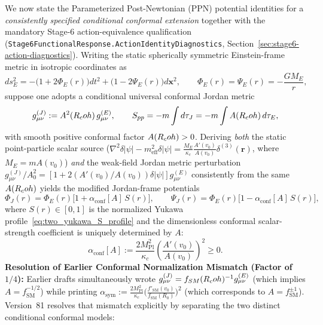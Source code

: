 We now state the Parameterized Post-Newtonian (PPN) potential identities for a \emph{consistently specified conditional conformal extension} together with the mandatory Stage-6 action-equivalence qualification (\texttt{Stage6FunctionalResponse.\allowbreak{}ActionIdentityDiagnostics}, Section~\ref{sec:stage6-action-diagnostics}). Writing the static spherically symmetric Einstein-frame metric in isotropic coordinates as
\[
ds_E^2 = -\bigl(1 + 2\Phi_E(r)\bigr)dt^2 + \bigl(1 - 2\Psi_E(r)\bigr)d\mathbf{x}^2,
\qquad
\Phi_E(r) = \Psi_E(r) = -\frac{G M_E}{r},
\]
suppose one adopts a conditional universal conformal Jordan metric
\begin{equation}
g_{\mu\nu}^{(J)} := A^2(R_coh)\,g_{\mu\nu}^{(E)},
\qquad
S_{pp} = -m\int d\tau_J = -m\int A(R_coh)\,d\tau_E,
\label{eq:conformal_metric_general_A}
\end{equation}
with smooth positive conformal factor $A(R_coh) > 0$. Deriving \emph{both} the static point-particle scalar source ($\nabla^2\delta|\psi| - m_{\mathrm{eff}}^2\delta|\psi| = \frac{M_E}{\kappa_c}\frac{A'(v_0)}{A(v_0)}\delta^{(3)}(\mathbf{r})$, where $M_E = m A(v_0)$) \emph{and} the weak-field Jordan metric perturbation $g_{\mu\nu}^{(J)}/A_0^2 = [1 + 2(A'(v_0)/A(v_0))\delta|\psi|]g_{\mu\nu}^{(E)}$ consistently from the same $A(R_coh)$ yields the modified Jordan-frame potentials
\begin{equation}
\Phi_J(r) = \Phi_E(r)\bigl[1 + \alpha_{\mathrm{conf}}[A]\,S(r)\bigr],
\qquad
\Psi_J(r) = \Phi_E(r)\bigl[1 - \alpha_{\mathrm{conf}}[A]\,S(r)\bigr],
\label{eq:jordan_potentials_exact}
\end{equation}
where $S(r) \in [0,1]$ is the normalized Yukawa profile~\eqref{eq:two_yukawa_S_profile} and the dimensionless conformal scalar-strength coefficient is uniquely determined by $A$:
\begin{equation}
\alpha_{\mathrm{conf}}[A]
:= \frac{2 M_{\mathrm{Pl}}^2}{\kappa_c}\left(\frac{A'(v_0)}{A(v_0)}\right)^2 \ge 0.
\label{eq:alpha_conf_general}
\end{equation}
\textbf{Resolution of Earlier Conformal Normalization Mismatch (Factor of $1/4$):} Earlier drafts simultaneously wrote $g_{\mu\nu}^{(J)} = f_{SM}(R_coh)^{-1} g_{\mu\nu}^{(E)}$ (which implies $A = f_{\mathrm{SM}}^{-1/2}$) while printing $\alpha_{\mathrm{sym}} := \frac{2 M_{\mathrm{Pl}}^2}{\kappa_c}\bigl(\frac{f'_{\mathrm{SM}}(v_0)}{f_{\mathrm{SM}}(R_0)}\bigr)^2$ (which corresponds to $A = f_{\mathrm{SM}}^{\pm 1}$). Version~81 resolves that mismatch explicitly by separating the two distinct conditional conformal models:
